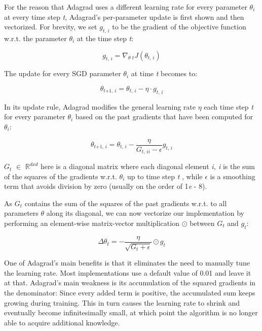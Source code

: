 \documentclass[12pt,oneside,a4paper,parskip]{scrbook}
\newcommand{\R}{\mathbb{R}}
\begin{document}
For the reason that Adagrad uses a different learning rate for every parameter $\theta_i$ at every time step \textit{t},
Adagrad's per-parameter update is first shown and then vectorized. For brevity, we set $\textit{g}_\textit{t, i}$ to be
the gradient of the objective function w.r.t. the parameter $\theta_i$ at the time step \textit{t}:

\begin{equation}
  \textit{g}_\textit{t, i} = \nabla_\textit{$\theta$ t}\textit{J}(\theta_\textit{t, i})
  \label{equ:Adagrad_1}
\end{equation}

The update for every SGD parameter $\theta_i$ at time \textit{t} becomes to:

\begin{equation}
  \theta_\textit{t+1, i} = \theta_\textit{t, i} - \eta \cdot \textit{g}_\textit{t, i}
\end{equation}

In its update rule, Adagrad modifies the general learning rate $\eta$ each time step \textit{t} for every parameter
$\theta_i$ based on the past gradients that have been computed for $\theta_i$:

\begin{equation}
  \theta_\textit{t+1, i} = \theta_\textit{t, i}-\frac{\eta}{\textit{G}_\textit{t, ii} - \epsilon} \textit{g}_\textit{t, i}
\end{equation}

$\textit{G}_t$ $\in$ $\R^\textit{dxd}$ here is a diagonal matrix where each diagonal element \textit{i, i} is the sum of the
squares of the gradients w.r.t. $\theta_i$ up to time step \textit{t} \cite{AdadeltaAddition}, while $\epsilon$ is a smoothing term that avoids
division by zero (usually on the order of 1\textit{e} - 8). 

As $\textit{G}_t$ contains the sum of the squares of the past gradients w.r.t. to all parameters $\theta$ along its
diagonal, we can now vectorize our implementation by performing an element-wise matrix-vector multiplication $\odot$
between $\textit{G}_t$ and $\textit{g}_t$:

\begin{equation}
  \Delta\theta_\textit{t} = -\frac{\eta}{\sqrt{\textit{G}_\textit{t} + \epsilon}} \odot \textit{g}_\textit{t}
  \label{equ:Adagrad_2}
\end{equation}

One of Adagrad’s main benefits is that it eliminates the need to manually tune the learning rate. Most implementations 
use a default value of 0.01 and leave it at that.
Adagrad’s main weakness is its accumulation of the squared gradients in the denominator: Since every added term is 
positive, the accumulated sum keeps growing during training. This in turn causes the learning rate to shrink and eventually
become infinitesimally small, at which point the algorithm is no longer able to acquire additional knowledge. \cite{overvieDiffRSLVQ}
\end{document}
